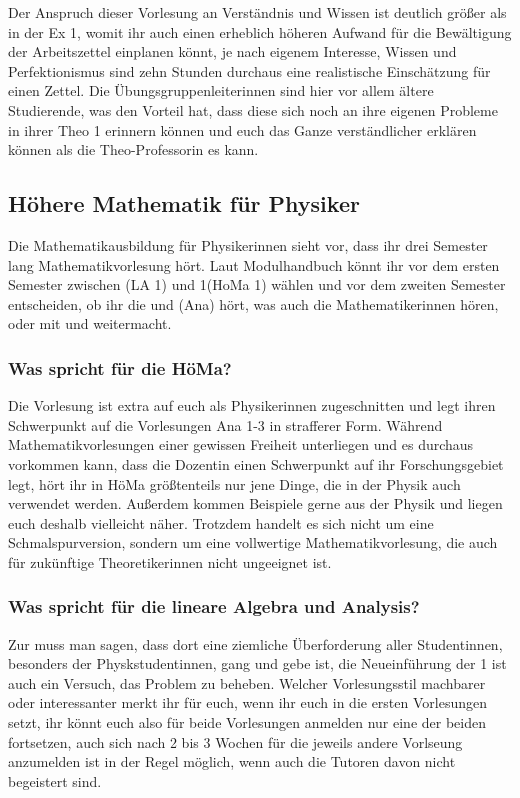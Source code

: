 Der Anspruch dieser Vorlesung an Verständnis und Wissen ist deutlich größer als in der \gls{Ex} 1, womit ihr auch einen erheblich höheren Aufwand für die Bewältigung der Arbeitszettel einplanen könnt, je nach eigenem Interesse, Wissen und Perfektionismus sind zehn Stunden durchaus eine realistische Einschätzung für einen Zettel. Die Übungsgruppenleiterinnen sind hier vor allem ältere Studierende, was den Vorteil hat, dass diese sich noch an ihre eigenen Probleme in ihrer \gls{Theo} 1 erinnern können und euch das Ganze verständlicher erklären können als die Theo-Professorin es kann.

\vspace{-2mm}
\subsection{Höhere Mathematik für Physiker}
\label{mathephysik}

Die Mathematikausbildung für Physikerinnen sieht vor, dass ihr drei Semester lang Mathematikvorlesung hört. Laut Modulhandbuch könnt ihr vor dem ersten Semester zwischen  (\gls{LA} 1) und  1(\gls{HoMa} 1) wählen und vor dem zweiten Semester entscheiden, ob ihr die  und  (\gls{Ana}) hört, was auch die Mathematikerinnen hören, oder mit  und  weitermacht.

\subsubsection{Was spricht für die HöMa?}
Die Vorlesung ist extra auf euch als Physikerinnen zugeschnitten und legt ihren Schwerpunkt auf die Vorlesungen \gls{Ana} 1-3 in strafferer Form. Während Mathematikvorlesungen einer gewissen Freiheit unterliegen und es durchaus vorkommen kann, dass die Dozentin einen Schwerpunkt auf ihr Forschungsgebiet legt, hört ihr in HöMa größtenteils nur jene Dinge, die in der Physik auch verwendet werden. Außerdem kommen Beispiele gerne aus der Physik und liegen euch deshalb vielleicht näher. Trotzdem handelt es sich nicht um eine Schmalspurversion, sondern um eine vollwertige Mathematikvorlesung, die auch für zukünftige Theoretikerinnen nicht ungeeignet ist.

\subsubsection{Was spricht für die lineare Algebra und Analysis?}
Zur  muss man sagen, dass dort eine ziemliche Überforderung aller
Studentinnen, besonders der Physkstudentinnen, gang und gebe ist, die Neueinführung der  1 ist auch ein Versuch, das Problem zu beheben. Welcher Vorlesungsstil machbarer oder interessanter merkt ihr für euch, wenn ihr euch in die ersten Vorlesungen setzt, ihr könnt euch also für beide Vorlesungen anmelden nur eine der beiden fortsetzen, auch sich nach 2 bis 3 Wochen für die jeweils andere Vorlseung anzumelden ist in der Regel möglich, wenn auch die Tutoren davon nicht begeistert sind.\\

